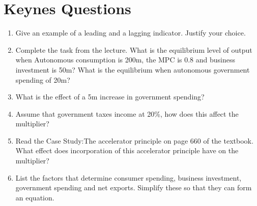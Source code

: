\documentclass{article}
\begin{document}
\section*{Keynes Questions}
\begin{enumerate}
\item Give an example of a leading and a lagging indicator.  Justify your choice. 

\item Complete the task from the lecture.  What is the equilibrium level of output when Autonomous consumption is \textsterling 200m, the MPC is 0.8 and business investment is \textsterling 50m?  What is the equilibrium when autonomous government spending of \textsterling 20m? 

\item What is the effect of a \textsterling 5m increase in government spending? 

\item Assume that government taxes income at 20\%, how does this affect the multiplier?  

\item Read the Case Study:The accelerator principle on page 660 of the textbook.  What effect does incorporation of this accelerator principle have on the multiplier?  

\item List the factors that determine consumer spending, business investment, government spending and net exports.  Simplify these so that they can form an equation. 
\end{enumerate}
\end{document}
